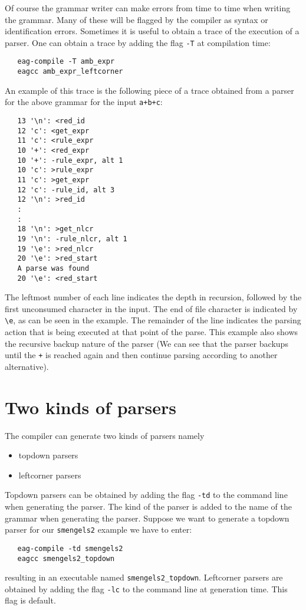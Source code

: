 Of course the grammar writer can make errors from time to time
when writing the grammar. Many of these will be flagged by the
compiler as syntax or identification errors. Sometimes it
is useful to obtain a trace of the execution of a parser.
One can obtain a trace by adding the flag {\tt -T} at
compilation time:
\begin{verbatim}
   eag-compile -T amb_expr
   eagcc amb_expr_leftcorner
\end{verbatim}
An example of this trace is the following piece of a trace
obtained from a parser for the above grammar for the input
{\tt a+b+c}:
\begin{verbatim}
   13 '\n': <red_id
   12 'c': <get_expr
   11 'c': <rule_expr
   10 '+': <red_expr
   10 '+': -rule_expr, alt 1
   10 'c': >rule_expr
   11 'c': >get_expr
   12 'c': -rule_id, alt 3
   12 '\n': >red_id
   :
   :
   18 '\n': >get_nlcr
   19 '\n': -rule_nlcr, alt 1
   19 '\e': >red_nlcr
   20 '\e': >red_start
   A parse was found
   20 '\e': <red_start
\end{verbatim}
The leftmost number of each line indicates the depth in recursion,
followed by the first unconsumed character in the input. The end
of file character is indicated by \verb+\e+, as can be seen in the
example. The remainder of the line indicates the parsing action
that is being executed at that point of the parse. This example also shows
the recursive backup nature of the parser (We can see that the parser
backups until the {\tt +} is reached again and then continue parsing
according to another alternative).
\section {Two kinds of parsers}
The \EAG compiler can generate two kinds of parsers namely
\begin {itemize}
\item topdown parsers
\item leftcorner parsers
\end {itemize}
Topdown parsers can be obtained by adding the flag {\tt -td} to
the command line when generating the parser. The kind of the parser
is added to the name of the grammar when generating the parser.
Suppose we want to generate a topdown parser for our {\tt smengels2}
example we have to enter:
\begin{verbatim}
   eag-compile -td smengels2
   eagcc smengels2_topdown
\end{verbatim}
resulting in an executable named {\tt smengels2\_topdown}.
Leftcorner parsers are obtained by adding the flag {\tt -lc} to
the command line at generation time. This flag is default.

